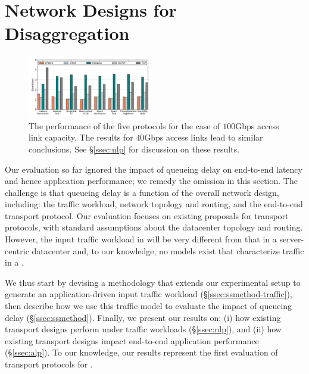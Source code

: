 \vspace{-0.1in}
\section{Network Designs for Disaggregation}
%
%
\begin{figure}[t]
  \centering
      \includegraphics[width = 0.485\textwidth]{img/slowdowns/100g/allFlows_rack-scale_slowdowns} 
  \caption{\small{The performance of the five protocols for the case of $100$Gbps access link capacity. The results for $40$Gbps access links lead to similar conclusions. See \S\ref{ssec:nlp} for discussion on these results.}}
  \label{fig:phostp}
\end{figure}
%
%
\label{sec:existing}
\vspace{-0.05in}
Our evaluation so far ignored the impact of queueing delay on end-to-end latency and hence application performance; we remedy the omission in this section.
The challenge is that queueing delay is a function of the overall network design, including: the traffic workload, network topology and routing, and the end-to-end transport protocol. Our evaluation focuses on existing proposals for transport protocols, with standard assumptions about the datacenter topology and routing. However, the input traffic workload in \dis will be very different from that in a server-centric datacenter and, to our knowledge, no models exist that characterize traffic in a \dis. 

We thus start by devising a methodology that extends our experimental setup to generate an application-driven input traffic workload (\S\ref{ssec:ssmethod-traffic}), then describe how we use this traffic model to evaluate the impact of queueing delay (\S\ref{ssec:ssmethod}). Finally, we present our results on: (i) how existing transport designs perform under \dis traffic workloads (\S\ref{ssec:nlp}), and (ii) how existing transport designs impact end-to-end application performance (\S\ref{ssec:alp}). To our knowledge, our results represent the first evaluation of transport protocols for \dis. 

